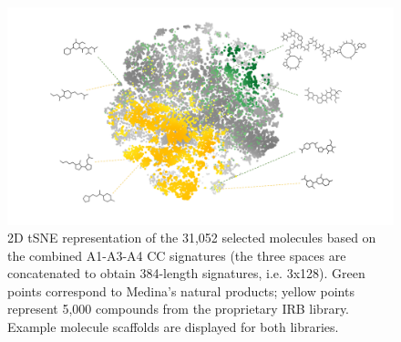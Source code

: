 \begin{figure}[htbp]
  \centering
  \includegraphics[width=1\linewidth]{figures/Navigation/Supplementary/Medina_v.2.png}
  \caption{2D tSNE representation of the 31,052 selected molecules based on the combined A1-A3-A4 CC signatures (the three spaces are concatenated to obtain 384-length signatures, i.e. 3x128). Green points correspond to Medina’s natural products; yellow points represent 5,000 compounds from the proprietary IRB library. Example molecule scaffolds are displayed for both libraries.
  }
  \label{Navigation_FigS3}
\end{figure}